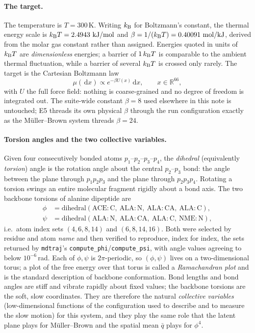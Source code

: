 \documentclass[11pt]{article}
\newcommand{\R}{\mathbb{R}}
\newcommand{\dd}{\,\mathrm{d}}
\begin{document}
\paragraph{The target.}
The temperature is $T=300\,$K.  Writing $k_{\rm B}$ for Boltzmann's constant,
the thermal energy scale is $k_{\rm B}T=2.4943\ \mathrm{kJ/mol}$ and
$\beta=1/(k_{\rm B}T)=0.40091\ \mathrm{mol/kJ}$, derived from the molar gas
constant rather than assigned.  Energies quoted in units of $k_{\rm B}T$ are
\emph{dimensionless} energies; a barrier of $1\,k_{\rm B}T$ is comparable to
the ambient thermal fluctuation, while a barrier of several $k_{\rm B}T$ is
crossed only rarely.  The target is the Cartesian Boltzmann law
\begin{equation}
 \mu(\dd x)\propto e^{-\beta U(x)}\dd x,\qquad x\in\R^{66},
 \label{eq:e5-target}
\end{equation}
with $U$ the full force field: nothing is coarse-grained and no degree of
freedom is integrated out.  The suite-wide constant $\beta=8$ used elsewhere in
this note is untouched; E5 threads its own physical $\beta$ through the run
configuration exactly as the M\"uller--Brown system threads $\beta=24$.

\paragraph{Torsion angles and the two collective variables.}
Given four consecutively bonded atoms $p_1$--$p_2$--$p_3$--$p_4$, the
\emph{dihedral} (equivalently \emph{torsion}) angle is the rotation angle about
the central $p_2$--$p_3$ bond: the angle between the plane through $p_1p_2p_3$
and the plane through $p_2p_3p_4$.  Rotating a torsion swings an entire
molecular fragment rigidly about a bond axis.  The two backbone torsions of
alanine dipeptide are
\begin{equation}
\begin{aligned}
 \phi&=\mathrm{dihedral}(\mathrm{ACE\!:\!C},\ \mathrm{ALA\!:\!N},\
 \mathrm{ALA\!:\!CA},\ \mathrm{ALA\!:\!C}),\\
 \psi&=\mathrm{dihedral}(\mathrm{ALA\!:\!N},\ \mathrm{ALA\!:\!CA},\
 \mathrm{ALA\!:\!C},\ \mathrm{NME\!:\!N}),
\end{aligned}
\end{equation}
i.e.\ atom index sets $(4,6,8,14)$ and $(6,8,14,16)$.  Both were selected by
residue and atom \emph{name} and then verified to reproduce, index for index,
the sets returned by \texttt{mdtraj}'s \texttt{compute\_phi}/\allowbreak\texttt{compute\_psi},
with angle values agreeing to below $10^{-6}\,$rad.  Each of $\phi,\psi$ is
$2\pi$-periodic, so $(\phi,\psi)$ lives on a two-dimensional torus; a plot of
the free energy over that torus is called a \emph{Ramachandran plot} and is the
standard description of backbone conformation.  Bond lengths and bond angles
are stiff and vibrate rapidly about fixed values; the backbone torsions are the
soft, slow coordinates.  They are therefore the natural \emph{collective
variables} (low-dimensional functions of the configuration used to describe and
to measure the slow motion) for this system, and they play the same role that
the latent plane plays for M\"uller--Brown and the spatial mean $\bar q$ plays
for $\phi^4$.
\end{document}
